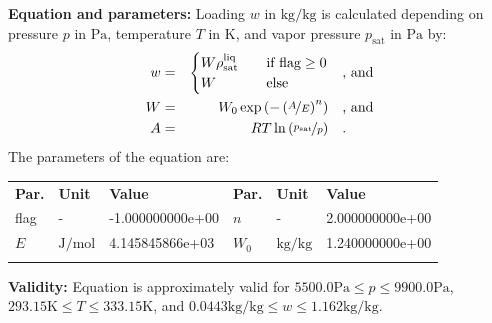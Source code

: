 \textbf{Equation and parameters:}
\newline
%
Loading $w$ in $\si{\kilogram\per\kilogram}$ is calculated depending on pressure $p$ in $\si{\pascal}$, temperature $T$ in $\si{\kelvin}$, and vapor pressure $p_\mathrm{sat}$ in $\si{\pascal}$ by:
%
\begin{equation*}
\begin{split}
w &=& \begin{cases} W \rho_\mathrm{sat}^{\mathrm{liq}} & \quad \text{if flag} \geq 0 \\ W & \quad \text{else} \end{cases} & \quad\text{, and} \\
W &=& W_0 \exp \left( - \left( \nicefrac{A}{E} \right) ^{n} \right) & \quad\text{, and} \\
A &=& R T \ln \left( \nicefrac{p_\mathrm{sat}}{p} \right) & \quad\text{.} \\
\end{split}
\end{equation*}
%
The parameters of the equation are:
%
\begin{longtable}[l]{lll|lll}
\toprule
\addlinespace
\textbf{Par.} & \textbf{Unit} & \textbf{Value} &	\textbf{Par.} & \textbf{Unit} & \textbf{Value} \\
\addlinespace
\midrule
\endhead

\bottomrule
\endfoot
\bottomrule
\endlastfoot
\addlinespace

flag & - & -1.000000000e+00 & $n$ & - & 2.000000000e+00 \\
$E$ & $\si{\joule\per\mole}$ & 4.145845866e+03 & $W_0$ & $\si{\kilogram\per\kilogram}$ & 1.240000000e+00 \\

\addlinespace\end{longtable}

\textbf{Validity:}
\newline
Equation is approximately valid for $5500.0 \si{\pascal} \leq p \leq 9900.0 \si{\pascal}$,  $293.15 \si{\kelvin} \leq T \leq 333.15 \si{\kelvin}$, and $0.0443 \si{\kilogram\per\kilogram} \leq w \leq 1.162 \si{\kilogram\per\kilogram}$.
\newline

